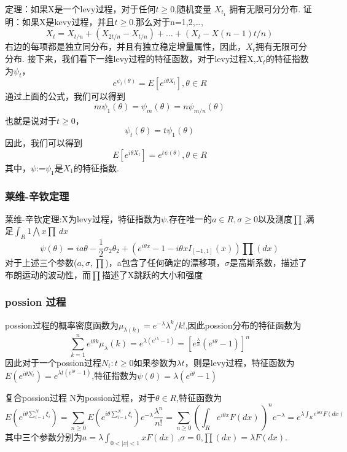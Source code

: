 \documentclass{beamer}
\begin{document}
\begin{frame}
定理：如果X是一个levy过程，对于任何$t \geq 0$,随机变量 $X_{t_1} $ 拥有无限可分分布.
证明：如果X是kevy过程，并且$t \geq 0$.那么对于n=1,2,\dots,\[ X_{t}=X_{t/n}+(X_{2t/n}-X_{t/n})+\dots+(X_{t}-X{(n-1)t/n})\]右边的每项都是独立同分布，并且有独立稳定增量属性，因此，${X_{t}}$拥有无限可分分布.
接下来，我们看下一维levy过程的特征函数，对于levy过程X,$X_{t}$的特征指数为$\psi_{t}$，\[e^{\psi_{t}(\theta)}=E[e^{i \theta X_{t}}] ,\theta \in R \]通过上面的公式，我们可以得到\[ m\psi_{1}(\theta)=\psi_{m}(\theta)=n\psi_{m/n}(\theta)\] 也就是说对于$t \geq 0$，\[\psi_{t}(\theta)=t\psi_{1}(\theta)\]因此，我们可以得到\[E[e^{i\theta X_{t}}]=e^{t\psi(\theta)}, \theta \in R\]其中，$\psi$:=$\psi_{1}$是$X_{1}$的特征指数.

\end{frame}
\begin{frame}
\frametitle{莱维-辛钦定理}
莱维-辛钦定理:X为levy过程，特征指数为$\psi$.存在唯一的$a \in R,\sigma \geq 0$以及测度$\prod$,满足$\int_R 1 \bigwedge x \prod \,dx$  \[\psi(\theta)=ia\theta-\frac{1}{2}\sigma_{2}\theta_{2}+(e^{i\theta x}-1-i\theta xI_{[-1,1]}(x))\prod(dx)\]对于上述三个参数($a,\sigma,\prod$)，a包含了任何确定的漂移项，$\sigma$是高斯系数，描述了布朗运动的波动性，而$\prod$描述了X跳跃的大小和强度
\end{frame}

\begin{frame}
\frametitle{possion 过程}
possion过程的概率密度函数为$\mu_{\lambda({k})}=e^{-\lambda}\lambda^{k}/k!$,因此possion分布的特征函数为\[\sum_{k=1}^{n}e^{i\theta k}\mu_{\lambda}({k})=e^{\lambda(e^{i\lambda}-1)}=[e^{\frac{\lambda}{n}}(e^{i\theta}-1)]^{n} \]因此对于一个possion过程{$N_{t}:t \geq 0$}如果参数为$\lambda t$，则是levy过程，特征函数为$E(e^{i\theta N_{t}})=e^{\lambda t(e^{i\theta}-1)}$,特征指数为$\psi(\theta)=\lambda(e^{i\theta}-1)$
\end{frame}

\begin{frame}
复合possion过程\newline\newline
N为possion过程，对于$\theta \in R $,特征函数为\[E(e^{i\theta\sum_{i=1}^{N}\xi_{i}})=\sum_{n\geq0}E(e^{i\theta\sum_{i=1}^{N}\xi_{i}})e^{-\lambda}\frac{\lambda^{n}}{n!}
=\sum_{n\geq0}(\int_R e^{i\theta x}F(dx)\,)^{n}e^{-\lambda}=e^{\lambda\int_R e^{i\theta x}F(dx)\,} \]其中三个参数分别为$a=\lambda\int_{0<|x|<1}xF(dx) \,$,$\sigma=0$,$\prod(dx)=\lambda F(dx)$.

\end{frame}
\end{document}
